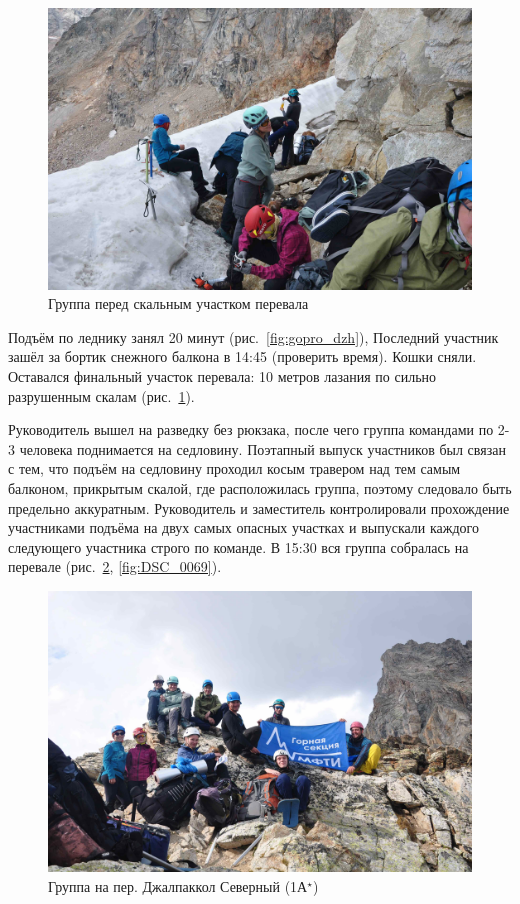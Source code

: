 \begin{figure}[h!]	
	\centering
	\includegraphics[angle=0, width=0.7\linewidth]{../pics/DSC_0021}
	\caption{Группа перед скальным участком перевала}
	\label{fig:DSC_0021}
\end{figure}

Подъём по леднику занял 20 минут (рис.~\ref{fig:gopro_dzh}), Последний участник зашёл за бортик снежного балкона в 14:45 \alert{(проверить время)}. Кошки сняли. Оставался финальный участок перевала: 10 метров лазания по сильно разрушенным скалам (рис.~\ref{fig:DSC_0021}).

Руководитель вышел на разведку без рюкзака, после чего группа командами по 2-3 человека поднимается на седловину. Поэтапный выпуск участников был связан с тем, что подъём на седловину проходил косым травером над тем самым балконом, прикрытым скалой, где расположилась группа, поэтому следовало быть предельно аккуратным. Руководитель и заместитель контролировали прохождение участниками подъёма на двух самых опасных участках и выпускали каждого следующего участника строго по команде. В 15:30 вся группа собралась на перевале (рис.~\ref{fig:DSC_0063}, \ref{fig:DSC_0069}).

\begin{figure}[h!]	
	\centering
	\includegraphics[angle=0, width=0.7\linewidth]{../pics/DSC_0063}
	\caption{Группа на пер. Джалпаккол Северный (1А$^\star$)}
	\label{fig:DSC_0063}
\end{figure}

